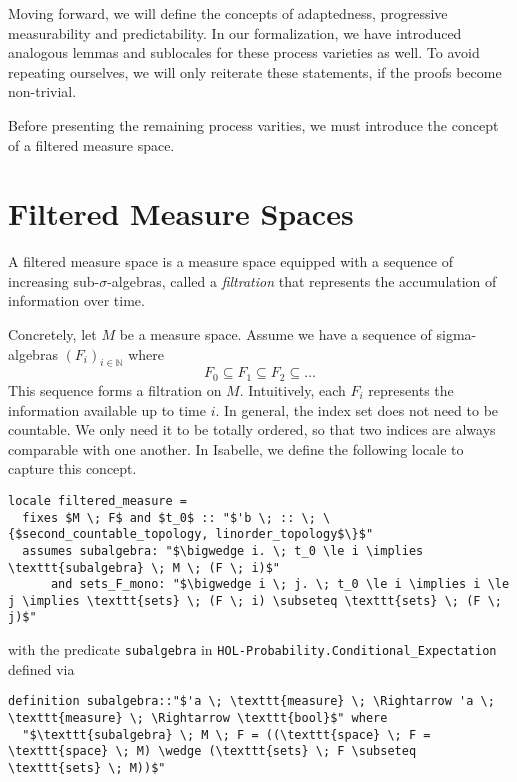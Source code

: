 \begin{remark}
Moving forward, we will define the concepts of adaptedness, progressive measurability and predictability. In our formalization, we have introduced analogous lemmas and sublocales for these process varieties as well. To avoid repeating ourselves, we will only reiterate these statements, if the proofs become non-trivial.
\end{remark}

Before presenting the remaining process varities, we must introduce the concept of a filtered measure space.

\section{Filtered Measure Spaces}

A filtered measure space is a measure space equipped with a sequence of increasing sub-$\sigma$-algebras, called a \textit{filtration} that represents the accumulation of information over time.

Concretely, let $M$ be a measure space. Assume we have a sequence of sigma-algebras $(F_i)_{i \in \mathbb{N}}$ where 
\[
	F_0 \subseteq F_1 \subseteq F_2 \subseteq \dots
\]
This sequence forms a filtration on $M$. Intuitively, each $F_i$ represents the information available up to time $i$. In general, the index set does not need to be countable. We only need it to be totally ordered, so that two indices are always comparable with one another. In Isabelle, we define the following locale to capture this concept.

\begin{isadefinition}
{\small
\begin{lstlisting}[style=isabelle]
locale filtered_measure = 
  fixes $M \; F$ and $t_0$ :: "$'b \; :: \; \{$second_countable_topology, linorder_topology$\}$"
  assumes subalgebra: "$\bigwedge i. \; t_0 \le i \implies \texttt{subalgebra} \; M \; (F \; i)$"
      and sets_F_mono: "$\bigwedge i \; j. \; t_0 \le i \implies i \le j \implies \texttt{sets} \; (F \; i) \subseteq \texttt{sets} \; (F \; j)$"
\end{lstlisting}

with the predicate \texttt{subalgebra} in \texttt{HOL-Probability.Conditional\_Expectation} defined via

\begin{lstlisting}[style=isabelle]
definition subalgebra::"$'a \; \texttt{measure} \; \Rightarrow 'a \; \texttt{measure} \; \Rightarrow \texttt{bool}$" where
  "$\texttt{subalgebra} \; M \; F = ((\texttt{space} \; F = \texttt{space} \; M) \wedge (\texttt{sets} \; F \subseteq \texttt{sets} \; M))$"
  \end{lstlisting}
}
\end{isadefinition}


